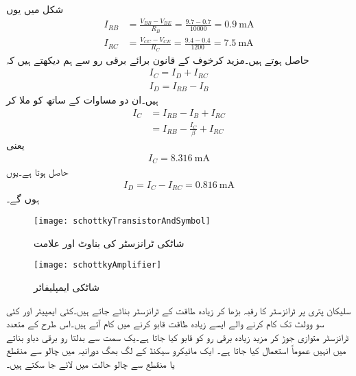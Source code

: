 شکل میں یوں
\begin{align*}
I_{RB}&=\frac{V_{BB}-V_{BE}}{R_B}=\frac{9.7-0.7}{10000}=\SI{0.9}{\milli \ampere}\\
I_{RC}&=\frac{V_{CC}-V_{CE}}{R_C}=\frac{9.4-0.4}{1200}=\SI{7.5}{\milli \ampere}
\end{align*}
حاصل ہوتے ہیں۔مزید کرخوف کے قانون برائے برقی رو سے ہم دیکھتے ہیں کہ
\begin{align*}
I_C=I_D+I_{RC}\\
I_D=I_{RB}-I_B
\end{align*}
ہیں۔ان دو مساوات کے ساتھ  کو ملا کر
\begin{align*}
I_C&=I_{RB}-I_B+I_{RC}\\
&=I_{RB}-\frac{I_C}{\beta}+I_{RC}
\end{align*}
یعنی
\begin{align*}
I_C=\SI{8.316}{\milli \ampere}
\end{align*}
حاصل ہوتا ہے۔یوں
\begin{align*}
I_D=I_C-I_{RC}=\SI{0.816}{\milli \ampere}
\end{align*}
ہوں گے۔
\begin{figure}
\centering
\texttt{[image: schottkyTransistorAndSymbol]}
\caption{شاٹکی ٹرانزسٹر کی بناوٹ اور علامت}
\label{شکل_ٹرانزسٹر_شاٹکی}
\end{figure}
%
\begin{figure}
\centering
\texttt{[image: schottkyAmplifier]}
\caption{شاٹکی ایمپلیفائر}
\label{شکل_ٹرانزسٹر_شاٹکی_ایمپلیفائر}
\end{figure}


سلیکان پتری پر ٹرانزسٹر کا رقبہ بڑھا کر زیادہ طاقت کے ٹرانزسٹر بنائے جاتے ہیں۔کئی ایمپیئر اور کئی سو وولٹ تک کام کرنے والے ایسے  زیادہ طاقت قابو کرنے میں کام آتے ہیں۔اس طرح کے متعدد ٹرانزسٹر متوازی جوڑ کر مزید زیادہ برقی رو کو قابو کیا جاتا ہے۔یک سمت سے بدلتا رو برقی دباو بناتے  میں انہیں عموماً استعمال کیا جاتا ہے۔ ایک مائیکرو سیکنڈ کے لگ بھگ دورانیہ میں چالو سے منقطع یا منقطع سے چالو حالت میں لائے جا سکتے ہیں۔

